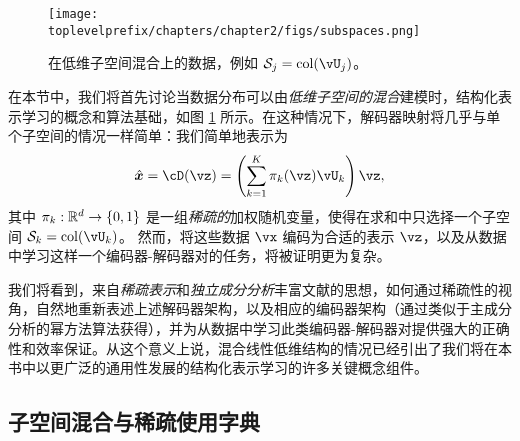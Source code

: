 \documentclass[../../book-main.tex]{subfiles}
\begin{document}
\begin{figure}
    \centering
    \texttt{[image: \\toplevelprefix/chapters/chapter2/figs/subspaces.png]}
    \caption{在低维子空间混合上的数据，例如 $\mathcal{S}_j = \mathop{\mathrm{col}}(\vU_j)$。}
    \label{fig:subspaces}
\end{figure}

在本节中，我们将首先讨论当数据分布可以由\textit{低维子空间的混合}建模时，结构化表示学习的概念和算法基础，如图 \ref{fig:subspaces} 所示。在这种情况下，解码器映射将几乎与单个子空间的情况一样简单：我们简单地表示为
\begin{equation}\label{eq:mixture-subspaces-decoder-first-cut}
    \hat{\x} = \cD(\vz) = \left( \sum_{k=1}^K \pi_k(\vz)\vU_k \right) \vz,
\end{equation}
其中 $\pi_k : \R^d \to \set{0,1}$ 是一组\textit{稀疏的}加权随机变量，使得在求和中只选择一个子空间 $\mathcal{S}_k = \mathop{\mathrm{col}}(\vU_k)$。
然而，将这些数据 $\vx$ 编码为合适的表示 $\vz$，以及从数据中学习这样一个编码器-解码器对的任务，将被证明更为复杂。

我们将看到，来自\textit{稀疏表示}和\textit{独立成分分析}丰富文献的思想，如何通过稀疏性的视角，自然地重新表述上述解码器架构，以及相应的编码器架构（通过类似于主成分分析的幂方法算法获得），并为从数据中学习此类编码器-解码器对提供强大的正确性和效率保证。从这个意义上说，混合线性低维结构的情况已经引出了我们将在本书中以更广泛的通用性发展的结构化表示学习的许多关键概念组件。


\subsection{子空间混合与稀疏使用字典}\label{sec:mixture-and-dict}

\end{document}
